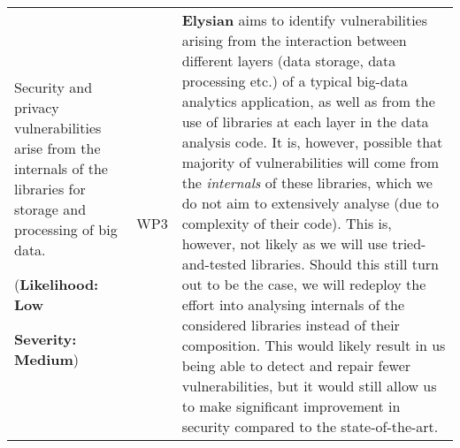 \documentclass[a4paper,11pt]{article}
\newcommand{\project}[1]{\textbf{#1}\xspace}
\newcommand{\SECURITY}{\project{Elysian}}
\newcommand{\TheProject}{\SECURITY}
\begin{document}
\begin{longtable}{| p{3.5cm} | p{1.5cm} | p{11.8cm}  |}
\\\hline
Security and privacy vulnerabilities arise from the internals of the libraries for storage and processing of big data.
\par
({\textbf{Likelihood: Low}}
\par
{\textbf{Severity: Medium}})
& WP3 &
\TheProject{} aims to identify vulnerabilities arising from the interaction between different layers (data storage, data processing etc.) of a typical big-data analytics application, as well as from the use of libraries at each layer in the data analysis code. It is, however, possible that majority of vulnerabilities will come from the \emph{internals} of these libraries, which we do not aim to extensively analyse (due to complexity of their code). This is, however,  not likely as we will use tried-and-tested libraries. Should this still turn out to be the case, we will redeploy the effort into analysing internals of the considered libraries instead of their composition. This would likely result in us being able to detect and repair fewer vulnerabilities, but it would still allow us to make significant improvement in security compared to the state-of-the-art.


\end{longtable}
\end{document}
